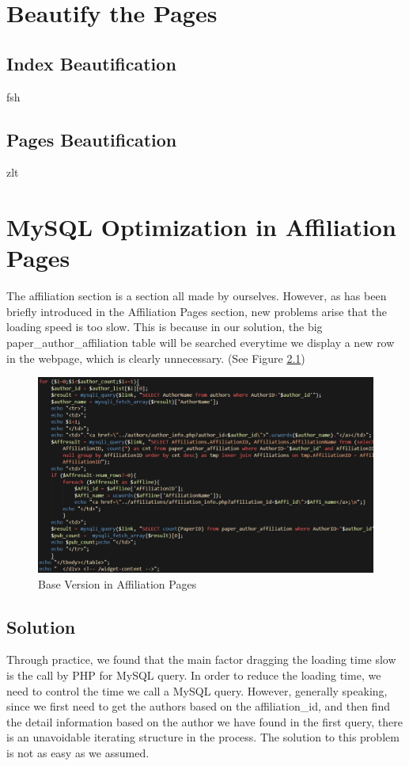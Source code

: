\documentclass{book}
\begin{document}
\chapter {Beautify the Pages}

\section {Index Beautification}

fsh

\section {Pages Beautification}

zlt


\chapter {MySQL Optimization in Affiliation Pages}

The affiliation section is a section all made by ourselves. However, as has been briefly introduced in the Affiliation Pages section, new problems arise that the loading speed is too slow. This is because in our solution, the big paper\_author\_affiliation table will be searched everytime we display a new row in the webpage, which is clearly unnecessary. (See Figure \ref{fig:opt_basic})
{}
\begin{figure}[H]
\centering{}
\includegraphics[scale=0.45]{img/zlt_opt_code_basic.png}
\caption{Base Version in Affiliation Pages}
\label{fig:opt_basic}
\end{figure}


\section {Solution}
Through practice, we found that the main factor dragging the loading time slow is the call by PHP for MySQL query. In order to reduce the loading time, we need to control the time we call a MySQL query. However, generally speaking, since we first need to get the authors based on the affiliation\_id, and then find the detail information based on the author we have found in the first query, there is an unavoidable iterating structure in the process. The solution to this problem is not as easy as we assumed.
\end{document}
